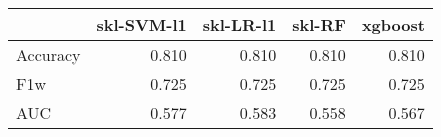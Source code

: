 \begin{tabular}{lrrrr}
\toprule
{} &  skl-SVM-l1 &  skl-LR-l1 &  skl-RF &  xgboost \\
\midrule
Accuracy &       0.810 &      0.810 &   0.810 &    0.810 \\
F1w      &       0.725 &      0.725 &   0.725 &    0.725 \\
AUC      &       0.577 &      0.583 &   0.558 &    0.567 \\
\bottomrule
\end{tabular}
